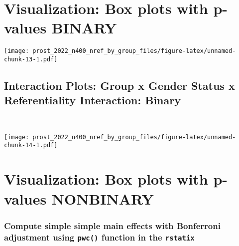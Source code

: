 \documentclass[
]{article}
\begin{document}
\section{Visualization: Box plots with p-values
BINARY}\label{visualization-box-plots-with-p-values-binary}

\texttt{[image: prost\_2022\_n400\_nref\_by\_group\_files/figure-latex/unnamed-chunk-13-1.pdf]}

\subsection{Interaction Plots: Group x Gender Status x Referentiality
Interaction:
Binary}\label{interaction-plots-group-x-gender-status-x-referentiality-interaction-binary}

~

\texttt{[image: prost\_2022\_n400\_nref\_by\_group\_files/figure-latex/unnamed-chunk-14-1.pdf]}

\section{Visualization: Box plots with p-values
NONBINARY}\label{visualization-box-plots-with-p-values-nonbinary}

\subsubsection{\texorpdfstring{Compute simple simple main effects with
Bonferroni adjustment using \texttt{pwc()} function in the
\texttt{rstatix}}{Compute simple simple main effects with Bonferroni adjustment using pwc() function in the rstatix}}\label{compute-simple-simple-main-effects-with-bonferroni-adjustment-using-pwc-function-in-the-rstatix-1}
\end{document}
